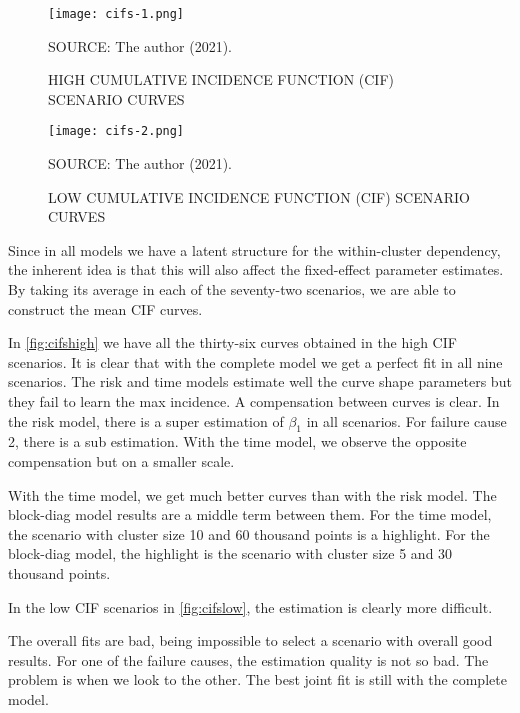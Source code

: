 \begin{figure}[H]
 \setlength{\abovecaptionskip}{.0001pt}
 \caption{HIGH CUMULATIVE INCIDENCE FUNCTION (CIF) SCENARIO CURVES}
 \vspace{0.2cm}\centering
 \texttt{[image: cifs-1.png]}\\
 \begin{footnotesize}
  SOURCE: The author (2021).
 \end{footnotesize}
 \label{fig:cifshigh}
\end{figure}

\begin{figure}[H]
 \setlength{\abovecaptionskip}{.0001pt}
 \caption{LOW CUMULATIVE INCIDENCE FUNCTION (CIF) SCENARIO CURVES}
 \vspace{0.2cm}\centering
 \texttt{[image: cifs-2.png]}\\
 \begin{footnotesize}
  SOURCE: The author (2021).
 \end{footnotesize}
 \label{fig:cifslow}
\end{figure}

Since in all models we have a latent structure for the within-cluster
dependency, the inherent idea is that this will also affect the
fixed-effect parameter estimates. By taking its average in each of the
seventy-two scenarios, we are able to construct the mean CIF curves.

In \autoref{fig:cifshigh} we have all the thirty-six curves obtained in
the high CIF scenarios. It is clear that with the complete model we get
a perfect fit in all nine scenarios. The risk and time models estimate
well the curve shape parameters but they fail to learn the max
incidence. A compensation between curves is clear. In the risk model,
there is a super estimation of \(\beta_{1}\) in all scenarios. For
failure cause 2, there is a sub estimation. With the time model, we
observe the opposite compensation but on a smaller scale.

With the time model, we get much better curves than with the risk
model. The block-diag model results are a middle term between them. For
the time model, the scenario with cluster size 10 and 60 thousand points
is a highlight. For the block-diag model, the highlight is the scenario
with cluster size 5 and 30 thousand points.

In the low CIF scenarios in \autoref{fig:cifslow}, the estimation is
clearly more difficult.

The overall fits are bad, being impossible to select a scenario with
overall good results. For one of the failure causes, the estimation
quality is not so bad. The problem is when we look to the other. The
best joint fit is still with the complete model.

